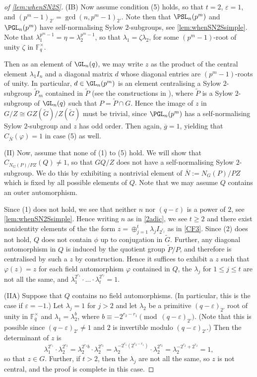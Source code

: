 \documentclass[eqthmnum, nocolour]{jt-calcs}
\newcommand{\wt}[1]{\widetilde{#1}}
\renewcommand{\epsilon}{\varepsilon}
\begin{document}
\begin{proof}[of \cref{lem:whenSN2S}]
(IB) Now assume condition (5) holds, so that $t=2$, $\epsilon=1$, and $(p^m-1)_{2'}=\gcd(n, p^m-1)_{2'}$.  Note then that $\PSL_n(p^m)$ and $\PGL_n(p^m)$ have self-normalising Sylow $2$-subgroups, see \cref{lem:whenSN2Ssimple}.  Note that $\lambda_1^{p^m-1}=\eta=\lambda_2^{p^m-1}$, so that $\lambda_1=\zeta\lambda_2$, for some $(p^m-1)$-root of unity $\zeta$ in $\mathbb{F}_q^\times$.  
 
 Then as an element of $\GL_n(q)$, we may write $z$ as the product of the central element $\lambda_1 I_n$ and a diagonal matrix $d$ whose diagonal entries are $(p^m-1)$-roots of unity.  In particular, $d\in \GL_n(p^m)$ is an element centralising a Sylow $2$-subgroup $\wt{P}_m$ contained in $\wt{P}$ (see the constructions in \cite{carter-fong:1964:the-Sylow-2-subgroups}), where $\wt{P}$ is a Sylow $2$-subgroup of $\GL_n(q)$ such that $P=\wt{P}\cap G$.  Hence the image of $z$ in $G/Z\cong GZ(\wt{G})/Z(\wt{G})$ must be trivial, since $\PGL_n(p^m)$ has a self-normalising Sylow $2$-subgroup and $z$ has odd order.  Then again, $\overline{g}=1$, yielding that $C_{\overline{N}}(\varphi)=1$ in case (5) as well.
 
 (II) Now, assume that none of (1) to (5) hold.   We will show that $C_{N_G(P)/PZ}(Q)\neq 1$, so that $GQ/Z$ does not have a self-normalising Sylow $2$-subgroup.   We do this by exhibiting a nontrivial element of $\overline{N}:=N_G(P)/PZ$ which is fixed by all possible elements of $Q$.  Note that we may assume $Q$ contains an outer automorphism.  
 
Since (1) does not hold, we see that neither $n$ nor $(q-\epsilon)$ is a power of $2$, see \cref{lem:whenSN2Ssimple}. Hence writing $n$ as in \eqref{2adic}, we see $t\geq 2$ and there exist nonidentity elements of the the form $z=\oplus_{j=1}^t \lambda_j I_{2^{r_j}}$ as in \eqref{CF3}.  Since (2) does not hold, $Q$ does not contain $\phi$ up to conjugation in $\wt{G}$.  Further, any diagonal automorphism in $Q$ is induced by the quotient group $\wt{P}/P$, and therefore is centralised by such a $z$ by construction.  Hence it suffices to exhibit a $z$ such that $\varphi(z)=z$ for each field automorphism $\varphi$ contained in $Q$, the $\lambda_j$ for $1\leq j\leq t$ are not all the same, and $\lambda_1^{2^{r_1}}\cdot...\cdot\lambda_t^{2^{r_t}}=1$. 
 
(IIA) Suppose that $Q$ contains no field automorphisms.  (In particular, this is the case if $\epsilon=-1$.)  Let $\lambda_j=1$ for $j>2$ and let $\lambda_2$ be a primitive $(q-\epsilon)_{2'}$ root of unity in $\mathbb{F}_{\overline{q}}^\times$ and $\lambda_1=\lambda_2^{b}$, where $b\equiv -2^{r_2-r_1}\pmod {(q-\epsilon)_{2'}}$. (Note that this is possible since $(q-\epsilon)_{2'}\neq1$ and  $2$ is invertible modulo $(q-\epsilon)_{2'}$.)  Then the determinant of $z$ is 
$$\lambda_1^{2^{r_1}}\cdot\lambda_2^{2^{r_2}}=\lambda_2^{2^{r_1}b}\cdot\lambda_2^{2^{r_2}}=\lambda_2^{-2^{r_1}(2^{r_2-r_1})}\cdot\lambda_2^{2^{r_2}}=\lambda_2^{-2^{r_2}+2^{r_2}}=1,$$ so that $z\in G$.  Further, if $t>2$, then the $\lambda_j$ are not all the same, so $z$ is not central, and the proof is complete in this case.  


\end{proof}
\end{document}
